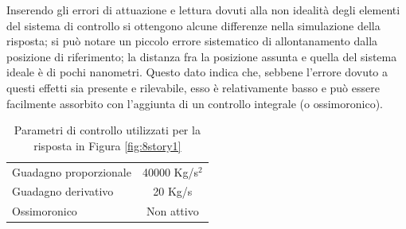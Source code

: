 Inserendo gli errori di attuazione e lettura dovuti alla non idealità degli elementi del sistema di controllo si ottengono alcune differenze nella simulazione della risposta; si può notare un piccolo errore sistematico di allontanamento dalla posizione di riferimento; la distanza fra la posizione assunta e quella del sistema ideale è di pochi nanometri. Questo dato indica che, sebbene l'errore dovuto a questi effetti sia presente e rilevabile, esso è relativamente basso e può essere facilmente assorbito con l'aggiunta di un controllo integrale (o ossimoronico). 
\begin{table}
\centering
\footnotesize
\begin{tabular}{lc}
\toprule
Guadagno proporzionale & 40000 Kg/s$^2$\\
Guadagno derivativo & 20 Kg/s\\
Ossimoronico & Non attivo\\
\bottomrule
\end{tabular}
\label{tab:8story1}
\caption{Parametri di controllo utilizzati per la risposta in Figura \ref{fig:8story1}}
\end{table}

